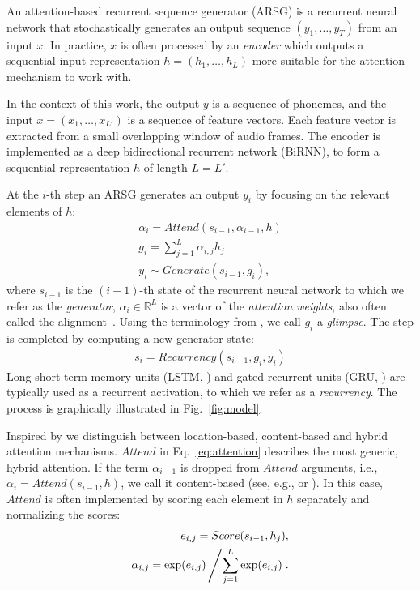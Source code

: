 \documentclass{article}
\begin{document}
An attention-based recurrent sequence generator (ARSG) is a recurrent neural
network that stochastically generates an output sequence $(y_1, \dots, y_T)$
from an input $x$.  In practice, $x$ is often processed by an {\it encoder}
which outputs a sequential input representation $h=(h_1,\ldots,h_L)$ more
suitable for the attention mechanism to work with.

In the context of this work, the output $y$ is a sequence of phonemes, and the
input $x=(x_1, \ldots, x_{L'})$ is a sequence of feature vectors. Each feature
vector is extracted from a small overlapping window of audio frames. The encoder
is implemented as a deep bidirectional recurrent network (BiRNN), to form a
sequential representation $h$ of length $L=L'$.

At the $i$-th step an ARSG generates an output $y_i$ by focusing on the relevant
elements of $h$:
\begin{align}
    \alpha_i = Attend(s_{i-1},\alpha_{i-1},h) 
    \label{eq:attention}
    \\
    g_i = \sum\limits_{j=1}^L \alpha_{i,j} h_j 
    \label{eq:glimpse}
    \\
    y_i \sim Generate(s_{i-1}, g_i),
    \label{eq:generate}
\end{align}
where $s_{i-1}$ is the $(i-1)$-th state of the recurrent neural network to which
we refer as the {\it generator}, $\alpha_i \in \mathbb{R}^L$ is a vector of the
{\it attention weights}, also often called the
alignment~\cite{bahdanau_neural_2014}. Using the terminology from
\cite{mnih_2014}, we call $g_i$ a {\it glimpse}. The step is completed by
computing a new generator state:
\begin{align}
s_i = Recurrency(s_{i-1}, g_i, y_i)
\label{eq:recurrency}
\end{align}
Long short-term memory units (LSTM, \cite{hochreiter_1997}) and gated recurrent
units (GRU, \cite{cho_2014}) are typically used as a recurrent activation, to
which we refer as a {\it recurrency}.  The process is graphically illustrated in
Fig.~\ref{fig:model}.

Inspired by \cite{graves_2014}  we distinguish between location-based,
content-based and hybrid attention mechanisms. $Attend$ in
Eq.~\eqref{eq:attention} describes the most generic, hybrid attention. If the
term $\alpha_{i-1}$ is dropped from $Attend$ arguments, i.e.,
$\alpha_i=Attend(s_{i-1},h)$,
we call it content-based (see, e.g., \cite{bahdanau_neural_2014} or
\cite{xu_show_2015}). In this case, $Attend$ is often implemented by scoring
each element in $h$ separately and normalizing the scores:
\begin{align}
  \label{eq:pure_cb_attention}
    e_{i,j}=Score(s_{i-1}, h_j), \\ 
  \label{eq:softmax_normalization}
    \alpha_{i,j} = 
        \exp(e_{i,j}) \left/
        \sum\limits_{j=1}^L \exp(e_{i,j}) \right..
\end{align}    
\end{document}
